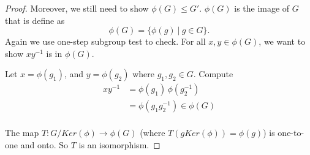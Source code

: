 \begin{proof}
    Moreover, we still need to show $\phi(G) \leq G'$. $\phi(G)$ is the image 
    of $G$ that is define as 
    \[
        \phi(G) = \{ \phi(g) \> | \> g \in G \}.
    \]
    Again we use one-step subgroup test to check. For all $x, y \in \phi(G)$, we want to show  
    $xy^{-1}$ is in $\phi(G)$.
    
    Let $x = \phi(g_1)$, and $y = \phi(g_2)$ where $g_1,g_2 \in G$. Compute 
    \begin{align*}
        xy^{-1} &= \phi(g_1)\, \phi(g_2^{-1})\\
        &= \phi(g_1 g_2^{-1}) \in \phi(G)\\
    \end{align*}

    The map $T: G/Ker(\phi) \to \phi(G)$ (where $T(g Ker(\phi)) = \phi(g)$) is one-to-one and onto. So $T$ is an isomorphism.
\end{proof}

